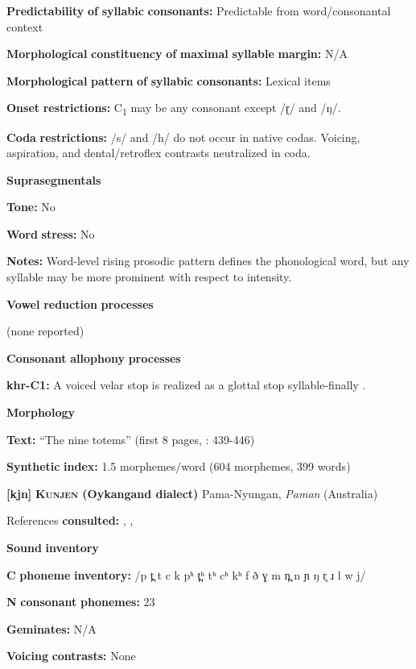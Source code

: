 \textbf{Predictability} \textbf{of} \textbf{syllabic} \textbf{consonants:} Predictable from word/consonantal context

\textbf{Morphological} \textbf{constituency} \textbf{of} \textbf{maximal} \textbf{syllable} \textbf{margin:} N/A

\textbf{Morphological} \textbf{pattern} \textbf{of} \textbf{syllabic} \textbf{consonants:} Lexical items

\textbf{Onset} \textbf{restrictions:} C\textsubscript{1} may be any consonant except /ɽ/ and /ŋ/.

\textbf{Coda} \textbf{restrictions:} /s/ and /h/ do not occur in native codas. Voicing, aspiration, and dental/retroflex contrasts neutralized in coda.

\textbf{Suprasegmentals}

\textbf{Tone:} No

\textbf{Word} \textbf{stress:} No

\textbf{Notes:} Word-level rising prosodic pattern defines the phonological word, but any syllable may be more prominent with respect to intensity.

\textbf{Vowel} \textbf{reduction} \textbf{processes}

(none reported)

\textbf{Consonant} \textbf{allophony} \textbf{processes}

\textbf{khr-C1:} A voiced velar stop is realized as a glottal stop syllable-finally \citep[29]{Peterson2011}.

\textbf{Morphology}

\textbf{Text:} “The nine totems” (first 8 pages, \citealt{Peterson2011}: 439-446)

\textbf{Synthetic} \textbf{index:} 1.5 morphemes/word (604 morphemes, 399 words)

\textbf{[kjn]}   \textbf{\textsc{Kunjen} \textbf{(Oykangand} \textbf{dialect)}}  Pama-Nyungan, \textit{Paman} (Australia)

References \textbf{consulted:} \citet{Dixon1970}, \citet{Sommer1969}, \citet{Sommer1981}

\textbf{Sound} \textbf{inventory}

\textbf{C} \textbf{phoneme} \textbf{inventory:} /p t̪ t c k pʰ t̪ʰ tʰ cʰ kʰ f ð ɣ m n̪ n ɲ ŋ r̥ ɹ l w j/

\textbf{N} \textbf{consonant} \textbf{phonemes:} 23

\textbf{Geminates:} N/A

\textbf{Voicing} \textbf{contrasts:} None

